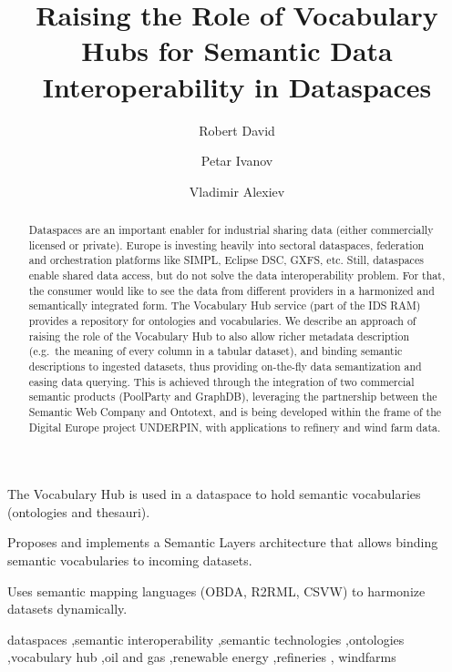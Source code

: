 \documentclass[
  super,
  preprint,
  3p]{elsarticle}
\begin{document}
\begin{frontmatter}
\title{Raising the Role of Vocabulary Hubs for Semantic Data
Interoperability in Dataspaces}
\author[1]{Robert David%
%
}
\author[2]{Petar Ivanov%
%
}
\author[2]{Vladimir Alexiev%
%
}





        
\begin{abstract}
Dataspaces are an important enabler for industrial sharing data (either
commercially licensed or private). Europe is investing heavily into
sectoral dataspaces, federation and orchestration platforms like SIMPL,
Eclipse DSC, GXFS, etc. Still, dataspaces enable shared data access, but
do not solve the data interoperability problem. For that, the consumer
would like to see the data from different providers in a harmonized and
semantically integrated form. The Vocabulary Hub service (part of the
IDS RAM) provides a repository for ontologies and vocabularies. We
describe an approach of raising the role of the Vocabulary Hub to also
allow richer metadata description (e.g.~the meaning of every column in a
tabular dataset), and binding semantic descriptions to ingested
datasets, thus providing on-the-fly data semantization and easing data
querying. This is achieved through the integration of two commercial
semantic products (PoolParty and GraphDB), leveraging the partnership
between the Semantic Web Company and Ontotext, and is being developed
within the frame of the Digital Europe project UNDERPIN, with
applications to refinery and wind farm data.
\end{abstract}



\begin{highlights}
\item The Vocabulary Hub is used in a dataspace to hold semantic
vocabularies (ontologies and thesauri).\item Proposes and implements a
Semantic Layers architecture that allows binding semantic vocabularies
to incoming datasets.\item Uses semantic mapping languages (OBDA, R2RML,
CSVW) to harmonize datasets dynamically.
\end{highlights}


\begin{keyword}
    dataspaces \sep semantic interoperability \sep semantic
technologies \sep ontologies \sep vocabulary hub \sep oil and
gas \sep renewable energy \sep refineries \sep 
    windfarms
\end{keyword}
\end{frontmatter}
    
\end{document}
